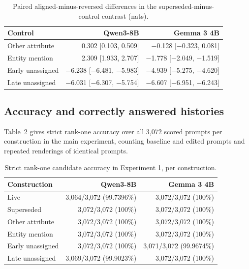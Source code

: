 \begin{table}[h]
\caption{Paired aligned-minus-reversed differences in the superseded-minus-control contrast (nats).}
\label{tab:b-paired}
\begin{center}
\small
\begin{tabular}{@{}lrr@{}}
\toprule
Control & Qwen3-8B & Gemma 3 4B \\
\midrule
Other attribute & 0.302 [0.103, 0.509] & −0.128 [−0.323, 0.081] \\
Entity mention & 2.309 [1.933, 2.707] & −1.778 [−2.049, −1.519] \\
Early unassigned & −6.238 [−6.481, −5.983] & −4.939 [−5.275, −4.620] \\
Late unassigned & −6.031 [−6.307, −5.754] & −6.607 [−6.951, −6.243] \\
\bottomrule
\end{tabular}
\end{center}
\end{table}

\subsection{Accuracy and correctly answered histories}

Table~\ref{tab:b-accuracy} gives strict rank-one accuracy over all 3,072 scored prompts per construction in the main experiment, counting baseline and edited prompts and repeated renderings of identical prompts.

\begin{table}[h]
\caption{Strict rank-one candidate accuracy in Experiment 1, per construction.}
\label{tab:b-accuracy}
\begin{center}
\small
\begin{tabular}{@{}lrr@{}}
\toprule
Construction & Qwen3-8B & Gemma 3 4B \\
\midrule
Live & 3,064/3,072 (99.7396\%) & 3,072/3,072 (100\%) \\
Superseded & 3,072/3,072 (100\%) & 3,072/3,072 (100\%) \\
Other attribute & 3,072/3,072 (100\%) & 3,072/3,072 (100\%) \\
Entity mention & 3,072/3,072 (100\%) & 3,072/3,072 (100\%) \\
Early unassigned & 3,072/3,072 (100\%) & 3,071/3,072 (99.9674\%) \\
Late unassigned & 3,069/3,072 (99.9023\%) & 3,072/3,072 (100\%) \\
\bottomrule
\end{tabular}
\end{center}
\end{table}

